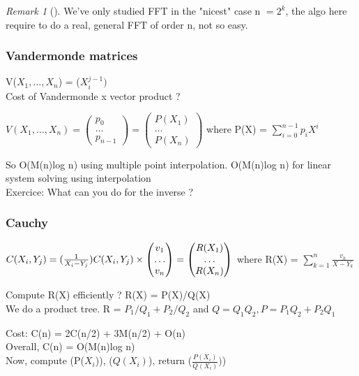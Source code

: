 \documentclass{article}
\theoremstyle{definition}
\theoremstyle{remark}
\newtheorem*{remark}{Remark}
\newcommand{\Rem}[3]{\begin{remark}[#1]\label{#2}#3\end{remark}}
\newcommand{\R}{\mathbb{R}}
\begin{document}
\Rem{}{}{We've only studied FFT in the "nicest" case n $= 2^k$, the algo here require to do a real, general FFT of order n, not so easy.}

\subsubsection{Vandermonde matrices}
V($X_1,\dots,X_n$) = ($X_i^{j-1})$\\
Cost of Vandermonde x vector product ?

$V(X_1,\dots,X_n) = \begin{pmatrix}
p_0\\\dots\\p_{n-1}
\end{pmatrix} = \begin{pmatrix}
P(X_1)\\\dots\\P(X_n)
\end{pmatrix}$ where P(X) = $\sum_{i = 0}^{n-1} p_iX^i$

So O(M(n)log n) using multiple point interpolation. O(M(n)log n) for linear system solving using interpolation\\

Exercice: What can you do for the inverse ?
\subsubsection{Cauchy}
$C(X_i,Y_j) = (\frac{1}{X_i-Y_j})\\
C(X_i,Y_j)\times\begin{pmatrix}
v_1\\\dots\\v_n
\end{pmatrix} = \begin{pmatrix}
R(X_1)\\\dots\\R(X_n)
\end{pmatrix}$ where R(X) = $\sum_{k=1}^n \frac{v_k}{X - Y_k}$

Compute R(X) efficiently ?
R(X) = P(X)/Q(X)\\
We do a product tree. R = $P_1/Q_1 + P_2/Q_2$ and $Q=Q_1Q_2, P=P_1Q_2+P_2Q_1$

Cost: C(n) = 2C(n/2) + 3M(n/2) + O(n)\\
Overall, C(n)  = O(M(n)log n)\\

Now, compute (P($X_i$)), ($Q(X_i)$), return ($\frac{P(X_i)}{Q(X_i)})$)\\
\end{document}
